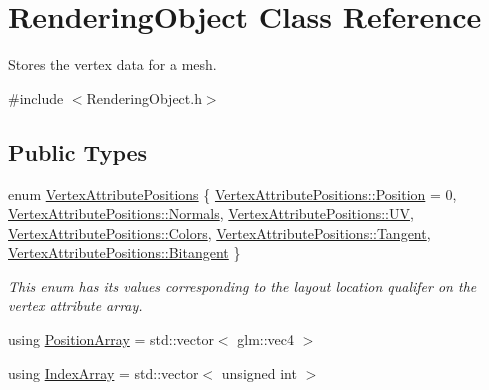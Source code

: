 \hypertarget{class_rendering_object}{}\section{Rendering\+Object Class Reference}
\label{class_rendering_object}


Stores the vertex data for a mesh.




{\ttfamily \#include $<$Rendering\+Object.\+h$>$}

\subsection*{Public Types}
\begin{DoxyCompactItemize}
\item
enum \hyperlink{class_rendering_object_ab772f569ef63a1db07db29a744b519ee}{Vertex\+Attribute\+Positions} \{ \newline
\hyperlink{class_rendering_object_ab772f569ef63a1db07db29a744b519eea52f5e0bc3859bc5f5e25130b6c7e8881}{Vertex\+Attribute\+Positions\+::\+Position} = 0,
\hyperlink{class_rendering_object_ab772f569ef63a1db07db29a744b519eea4ab971a51f0335cbf8d9c2c65d379e99}{Vertex\+Attribute\+Positions\+::\+Normals},
\hyperlink{class_rendering_object_ab772f569ef63a1db07db29a744b519eeadeaa2adbeb26802ae61609c3f3642d82}{Vertex\+Attribute\+Positions\+::\+UV},
\hyperlink{class_rendering_object_ab772f569ef63a1db07db29a744b519eea5d50889672f6f860d14f502de3de1957}{Vertex\+Attribute\+Positions\+::\+Colors},
\newline
\hyperlink{class_rendering_object_ab772f569ef63a1db07db29a744b519eea541671cb1be09d76a84ba1a873ec3fc8}{Vertex\+Attribute\+Positions\+::\+Tangent},
\hyperlink{class_rendering_object_ab772f569ef63a1db07db29a744b519eeae3e73a4b6e7cfd12008a35f6a051b319}{Vertex\+Attribute\+Positions\+::\+Bitangent}
 \}\begin{DoxyCompactList}\small\item\em This enum has its values corresponding to the layout location qualifer on the vertex attribute array. \end{DoxyCompactList}
\item
using \hyperlink{class_rendering_object_a1223b9cf03f2029b9c43d71042c2a18e}{Position\+Array} = std\+::vector$<$ glm\+::vec4 $>$
\item
using \hyperlink{class_rendering_object_a9931c88bca3384065c6691dfe1e60af1}{Index\+Array} = std\+::vector$<$ unsigned int $>$
\item

\end{DoxyCompactItemize}
